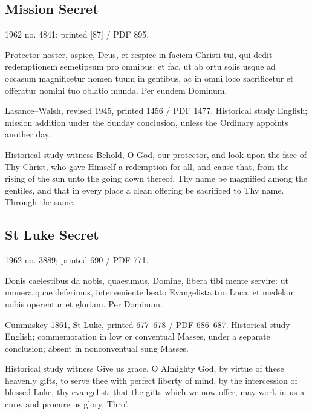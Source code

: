 \subsection{Mission Secret}
\label{proper-mission-secret}

1962 no. 4841; printed [87] / PDF 895.

\begin{latinproper}
Protector noster, aspice, Deus, et respice in faciem Christi tui, qui dedit redemptionem semetipsum pro omnibus: et fac, ut ab ortu solis usque ad occasum magnificetur nomen tuum in gentibus, ac in omni loco sacrificetur et offeratur nomini tuo oblatio munda. Per eundem Dominum.
\end{latinproper}

Lasance–Walsh, revised 1945, printed 1456 / PDF 1477. Historical study English; mission addition under the Sunday conclusion, unless the Ordinary appoints another day.

\begin{englishwitness}{Historical study witness}
Behold, O God, our protector, and look upon the face of Thy Christ, who gave Himself a redemption for all, and cause that, from the rising of the sun unto the going down thereof, Thy name be magnified among the gentiles, and that in every place a clean offering be sacrificed to Thy name. Through the same.
\end{englishwitness}

\subsection{St Luke Secret}
\label{proper-luke-secret}

1962 no. 3889; printed 690 / PDF 771.

\begin{latinproper}
Donis caelestibus da nobis, quaesumus, Domine, libera tibi mente servire: ut munera quae deferimus, interveniente beato Evangelista tuo Luca, et medelam nobis operentur et gloriam. Per Dominum.
\end{latinproper}

Cummiskey 1861, St Luke, printed 677–678 / PDF 686–687. Historical study English; commemoration in low or conventual Masses, under a separate conclusion; absent in nonconventual sung Masses.

\begin{englishwitness}{Historical study witness}
Give us grace, O Almighty God, by virtue of these heavenly gifts, to serve thee with perfect liberty of mind, by the intercession of blessed Luke, thy evangelist: that the gifts which we now offer, may work in us a cure, and procure us glory. Thro’.
\end{englishwitness}

